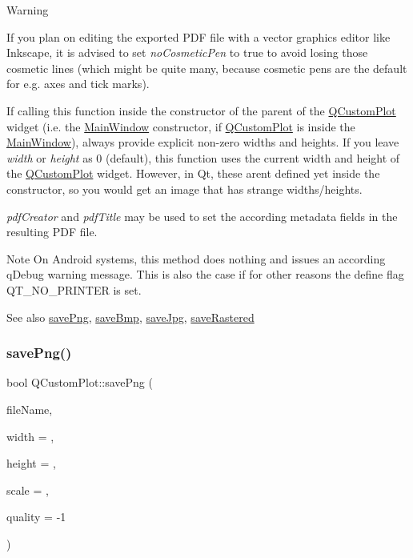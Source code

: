 \begin{DoxyWarning}{Warning}
\begin{DoxyItemize}
\item If you plan on editing the exported P\+DF file with a vector graphics editor like Inkscape, it is advised to set {\itshape no\+Cosmetic\+Pen} to true to avoid losing those cosmetic lines (which might be quite many, because cosmetic pens are the default for e.\+g. axes and tick marks). \item If calling this function inside the constructor of the parent of the \hyperlink{class_q_custom_plot}{Q\+Custom\+Plot} widget (i.\+e. the \hyperlink{class_main_window}{Main\+Window} constructor, if \hyperlink{class_q_custom_plot}{Q\+Custom\+Plot} is inside the \hyperlink{class_main_window}{Main\+Window}), always provide explicit non-\/zero widths and heights. If you leave {\itshape width} or {\itshape height} as 0 (default), this function uses the current width and height of the \hyperlink{class_q_custom_plot}{Q\+Custom\+Plot} widget. However, in Qt, these aren\textquotesingle{}t defined yet inside the constructor, so you would get an image that has strange widths/heights.\end{DoxyItemize}
{\itshape pdf\+Creator} and {\itshape pdf\+Title} may be used to set the according metadata fields in the resulting P\+DF file.
\end{DoxyWarning}
\begin{DoxyNote}{Note}
On Android systems, this method does nothing and issues an according q\+Debug warning message. This is also the case if for other reasons the define flag Q\+T\+\_\+\+N\+O\+\_\+\+P\+R\+I\+N\+T\+ER is set.
\end{DoxyNote}
\begin{DoxySeeAlso}{See also}
\hyperlink{class_q_custom_plot_a7636261aff1f6d25c9da749ece3fc8b8}{save\+Png}, \hyperlink{class_q_custom_plot_a6629d9e8e6da4bf18055ee0257fdce9a}{save\+Bmp}, \hyperlink{class_q_custom_plot_a490c722092d1771e8ce4a7a73dfd84ab}{save\+Jpg}, \hyperlink{class_q_custom_plot_ab528b84cf92baabe29b1d0ef2f77c93e}{save\+Rastered} 
\end{DoxySeeAlso}
\hypertarget{class_q_custom_plot_a7636261aff1f6d25c9da749ece3fc8b8}{}\label{class_q_custom_plot_a7636261aff1f6d25c9da749ece3fc8b8} 
\subsubsection{\texorpdfstring{save\+Png()}{savePng()}}
{\footnotesize\ttfamily bool Q\+Custom\+Plot\+::save\+Png (\begin{DoxyParamCaption}\item[{const Q\+String \&}]{file\+Name,  }\item[{int}]{width = {},  }\item[{int}]{height = {},  }\item[{double}]{scale = {},  }\item[{int}]{quality = {\ttfamily -\/1} }\end{DoxyParamCaption})}


